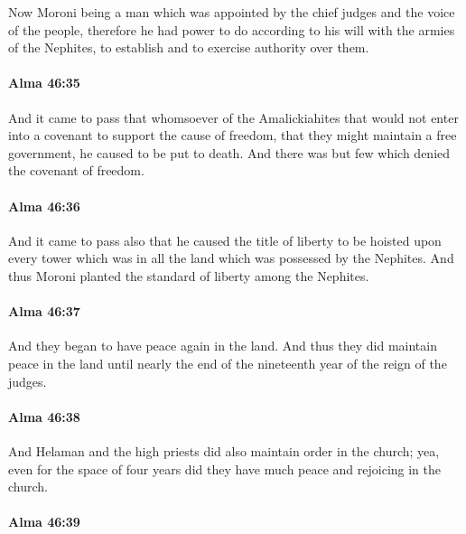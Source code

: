 			Now Moroni being a man
			which was appointed by the chief judges and the voice of the people,
			therefore he had power to do according to his will
			with the armies of the Nephites,
			to establish and to exercise authority over them.

		\paragraph{Alma 46:35} %
			\label{ALMA-46-35}

			And it came to pass that whomsoever of the Amalickiahites
			that would not enter into a covenant to support the cause of freedom,
			that they might maintain a free government,
			he caused to be put to death.
			And there was but few which denied the covenant of freedom.

		\paragraph{Alma 46:36} %
			\label{ALMA-46-36}

			And it came to pass also that he caused the title of liberty
			to be hoisted upon every tower
			which was in all the land which was possessed by the Nephites.
			And thus Moroni planted the standard of liberty among the Nephites.

		\paragraph{Alma 46:37} %
			\label{ALMA-46-37}

			And they began to have peace again in the land.
			And thus they did maintain peace in the land
			until nearly the end of the nineteenth year of the reign of the judges.

		\paragraph{Alma 46:38} %
			\label{ALMA-46-38}

			And Helaman and the high priests did also maintain order in the church;
			yea, even for the space of four years
			did they have much peace and rejoicing in the church.

		\paragraph{Alma 46:39} %
			\label{ALMA-46-39}


